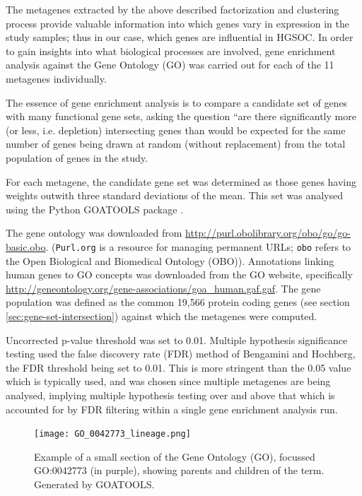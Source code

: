 \documentclass[draft, tikz, 12pt,a4paper,oneside,fleqn]{article}
\begin{document}
The metagenes extracted by the above described factorization and clustering process provide valuable information into which genes vary in expression in the study samples; thus in our case, which genes are influential in HGSOC.  
In order to gain insights into what biological processes are involved, gene enrichment analysis against the Gene Ontology (GO) was carried out for each of the 11 metagenes individually.

The essence of gene enrichment analysis is to compare a candidate set of genes with many functional gene sets, asking the question ``are there significantly more (or less, i.e. depletion) intersecting genes than would be expected for the same number of genes being drawn at random (without replacement) from the total population of genes in the study. 

For each metagene, the candidate gene set was determined as those genes having weights outwith three standard deviations of the mean.   This set was analysed using the Python GOATOOLS package \cite{Klopfenstein2018}.   

The gene ontology was downloaded from \url{http://purl.obolibrary.org/obo/go/go-basic.obo}.  ({\tt Purl.org} is a resource for managing permanent URLs; {\tt obo} refers to the Open Biological and Biomedical Ontology (OBO)).  
Annotations linking human genes to GO concepts was downloaded from the GO website, specifically \url{http://geneontology.org/gene-associations/goa_human.gaf.gaf}.   
The gene population was defined as the common 19,566 protein coding genes (see section \ref{sec:gene-set-intersection}) against which the metagenes were computed.  

Uncorrected p-value threshold was set to 0.01.
Multiple hypothesis significance testing used the false discovery rate (FDR) method of Bengamini and Hochberg, the FDR threshold being set to 0.01.  This is more stringent than the 0.05 value which is typically used, and was chosen since multiple metagenes are being analysed, implying multiple hypothesis testing over and above that which is accounted for by FDR filtering within a single gene enrichment analysis run.

\begin{figure}[ht]
\begin{center}
\texttt{[image: GO\_0042773\_lineage.png]}
\caption{Example of a small section of the Gene Ontology (GO), focussed GO:0042773 (in purple), showing parents and children of the term.   Generated by GOATOOLS.}
\label{fig:eg_go_graphic}
\end{center}
\end{figure}
\end{document}
